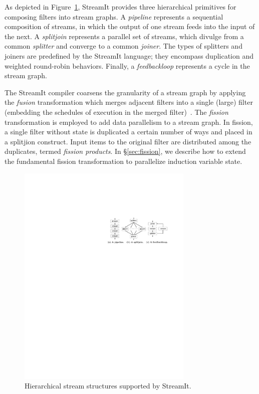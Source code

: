 As depicted in Figure~\ref{fig:structures}, StreamIt provides three
hierarchical primitives for composing filters into stream graphs.  A
{\it pipeline} represents a sequential composition of streams, in
which the output of one stream feeds into the input of the next.  A
{\it splitjoin} represents a parallel set of streams, which divulge
from a common {\it splitter} and converge to a common {\it joiner}.
The types of splitters and joiners are predefined by the StreamIt
language; they encompass duplication and weighted round-robin
behaviors.  Finally, a {\it feedbackloop} represents a cycle in the
stream graph.

The StreamIt compiler coarsens the granularity of a stream graph by
applying the {\it fusion} transformation which merges adjacent filters
into a single (large) filter (embedding the schedules of execution in
the merged filter)~\cite{streamit-asplos}.  The {\it fission}
transformation is employed to add data parallelism to a stream graph.
In fission, a single filter without state is duplicated a certain
number of ways and placed in a splitjion construct.  Input items to
the original filter are distributed among the duplicates, termed {\it
  fission products}.  In \S\ref{sec:fission}, we describe how to
extend the fundamental fission transformation to parallelize induction
variable state.

\begin{figure}[t!]
\centering
\includegraphics[width=3.3in]{stream-structures.pdf}
\caption{Hierarchical stream structures supported by StreamIt.\protect\label{fig:structures}}
\end{figure}

